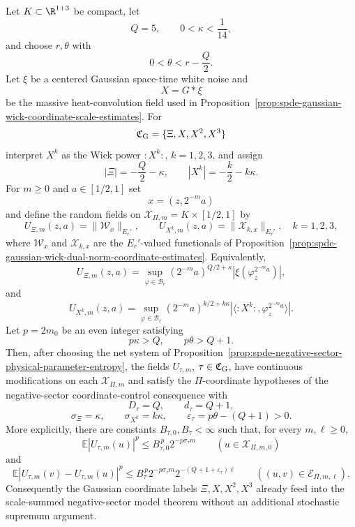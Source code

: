 \begin{proposition}
\label{prop:spde-gaussian-negative-pi-coordinate-input}
Let \(K\subset\R^{1+3}\) be compact, let
\[
  Q=5,\qquad 0<\kappa<\frac1{14},
\]
and choose \(r,\theta\) with
\[
  0<\theta<r-\frac Q2 .
\]
Let \(\xi\) be a centered Gaussian space-time white noise and
\[
  X=G*\xi
\]
be the massive heat-convolution field used in
Proposition~\ref{prop:spde-gaussian-wick-coordinate-scale-estimates}.  For
\[
  \mathfrak C_{\rm G}=\{\Xi,X,X^2,X^3\}
\]
interpret \(X^k\) as the Wick power \(:X^k:\), \(k=1,2,3\), and assign
\[
  |\Xi|=-\frac Q2-\kappa,\qquad
  |X^k|=-\frac k2-k\kappa .
\]
For \(m\geq0\) and \(a\in[1/2,1]\) set
\[
  x=(z,2^{-m}a)
\]
and define the random fields on
\(\mathcal X_{\Pi,m}=K\times[1/2,1]\) by
\begin{equation}
  U_{\Xi,m}(z,a)=\|\mathcal W_x\|_{E_r'},
  \qquad
  U_{X^k,m}(z,a)=\|\mathcal X_{k,x}\|_{E_r'},
  \quad k=1,2,3,
  \label{eq:spde-gaussian-pi-coordinate-fields}
\end{equation}
where \(\mathcal W_x\) and \(\mathcal X_{k,x}\) are the \(E_r'\)-valued
functionals of
Proposition~\ref{prop:spde-gaussian-wick-dual-norm-coordinate-estimates}.
Equivalently,
\[
  U_{\Xi,m}(z,a)
  =
  \sup_{\varphi\in\mathcal B_r}
  (2^{-m}a)^{Q/2+\kappa}
  |\xi(\varphi_z^{2^{-m}a})|,
\]
and
\[
  U_{X^k,m}(z,a)
  =
  \sup_{\varphi\in\mathcal B_r}
  (2^{-m}a)^{k/2+k\kappa}
  |\langle :X^k:,\varphi_z^{2^{-m}a}\rangle|.
\]
Let \(p=2m_0\) be an even integer satisfying
\begin{equation}
  p\kappa>Q,
  \qquad
  p\theta>Q+1 .
  \label{eq:spde-gaussian-negative-input-moment-condition}
\end{equation}
Then, after choosing the net system of
Proposition~\ref{prop:spde-negative-sector-physical-parameter-entropy}, the
fields \(U_{\tau,m}\), \(\tau\in\mathfrak C_{\rm G}\), have continuous
modifications on each \(\mathcal X_{\Pi,m}\) and satisfy the
\(\Pi\)-coordinate hypotheses of
the negative-sector coordinate-control consequence with
\[
  D_\tau=Q,\qquad d_\tau=Q+1,
\]
\begin{equation}
  \sigma_\Xi=\kappa,
  \qquad
  \sigma_{X^k}=k\kappa,
  \qquad
  \varepsilon_\tau=p\theta-(Q+1)>0 .
  \label{eq:spde-gaussian-negative-input-slacks}
\end{equation}
More explicitly, there are constants \(B_{\tau,0},B_\tau<\infty\) such that,
for every \(m,\ell\geq0\),
\begin{equation}
  \mathbb E|U_{\tau,m}(u)|^p
  \leq
  B_{\tau,0}^{\,p}2^{-p\sigma_\tau m}
  \qquad
  (u\in\mathcal X_{\Pi,m,0})
  \label{eq:spde-gaussian-negative-input-base}
\end{equation}
and
\begin{equation}
  \mathbb E|U_{\tau,m}(v)-U_{\tau,m}(u)|^p
  \leq
  B_\tau^{\,p}2^{-p\sigma_\tau m}
  2^{-(Q+1+\varepsilon_\tau)\ell}
  \qquad
  ((u,v)\in\mathcal E_{\Pi,m,\ell}).
  \label{eq:spde-gaussian-negative-input-edge}
\end{equation}
Consequently the Gaussian coordinate labels \(\Xi,X,X^2,X^3\) already feed
into the scale-summed negative-sector model theorem without an additional
stochastic supremum argument.


\end{proposition}
